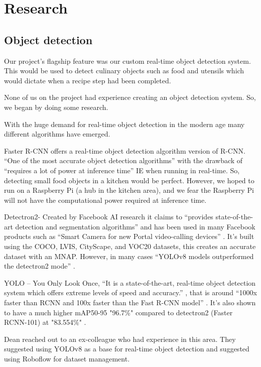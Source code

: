 \documentclass{article}
\begin{document}
    \section{Research}
    \subsection{Object detection}
    Our project's flagship feature was our custom real-time object detection system. This would be used to detect culinary objects such as food and utensils which would dictate when a recipe step had been completed.
    
None of us on the project had experience creating an object detection system. So, we began by doing some research. 

With the huge demand for real-time object detection in the modern age many different algorithms have emerged.

Faster R-CNN offers a real-time object detection algorithm version of R-CNN. “One of the most accurate object detection algorithms” \cite{FasterRCNN} with the drawback of “requires a lot of power at inference time” IE when running in real-time. So, detecting small food objects in a kitchen would be perfect. However, we hoped to run on a Raspberry Pi (a hub in the kitchen area), and we fear the Raspberry Pi will not have the computational power required \cite{Fast-CNN-Rasberry-Pi} at inference time.

Detectron2- Created by Facebook AI research it claims to “provides state-of-the-art detection and segmentation algorithms” \cite{wu2019detectron2} and has been used in many Facebook products such as “Smart Camera for new Portal video-calling devices” \cite{metasmartcameras}. It’s built using the COCO, LVIS, CityScape, and VOC20 datasets, this creates an accurate dataset with an MNAP. However, in many cases “YOLOv8 models outperformed the detectron2 mode” \cite{ai5010005}.

YOLO – You Only Look Once, “It is a state-of-the-art, real-time object detection system which offers extreme levels of speed and accuracy.” \cite{rajeshwari2019object}, that is around “1000x faster than RCNN and 100x faster than the Fast R-CNN model” \cite{rajeshwari2019object}.  It's also shown to have a much higher mAP50-95 "96.7\%" compared to detectron2 (Faster RCNN-101) at "83.554\%" \cite{ai5010005}.

Dean reached out to an ex-colleague who had experience in this area. They suggested using YOLOv8 \cite{Jocher_Ultralytics_YOLO_2023} as a base for real-time object detection and suggested using Roboflow \cite{RoboFlow-Software} for dataset management. 
\end{document}
